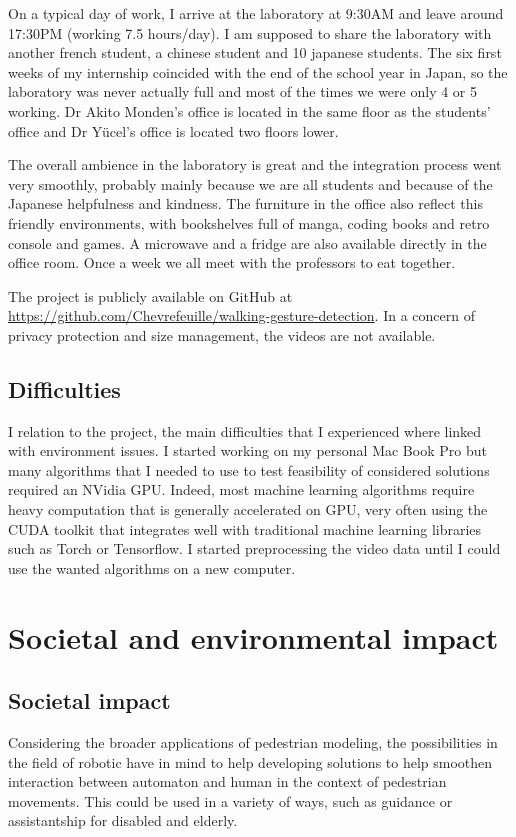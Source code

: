 \documentclass[12pt,a4paper,twoside]{article}
\begin{document}
On a typical day of work, I arrive at the laboratory at 9:30AM and leave around 17:30PM (working 7.5 hours/day). I am supposed to share the laboratory with another french student, a chinese student and 10 japanese students. The six first weeks of my internship coincided with the end of the school year in Japan, so the laboratory was never actually full and most of the times we were only 4 or 5 working. Dr Akito Monden's office is located in the same floor as the students' office and Dr Yücel's office is located two floors lower. 

The overall ambience in the laboratory is great and the integration process went very smoothly, probably mainly because we are all students and because of the Japanese helpfulness and kindness. The furniture in the office also reflect this friendly environments, with bookshelves full of manga, coding books and retro console and games. A microwave and a fridge are also available directly in the office room. Once a week we all meet with the professors to eat together.

The project is publicly available on GitHub at \url{https://github.com/Chevrefeuille/walking-gesture-detection}. In a concern of privacy protection and size management, the videos are not available.

\subsection{Difficulties}
I relation to the project, the main difficulties that I experienced where linked with environment issues. I started working on my personal Mac Book Pro but many algorithms that I needed to use to test feasibility of considered solutions required an NVidia GPU. Indeed, most machine learning algorithms require heavy computation that is generally accelerated on GPU, very often using the CUDA toolkit that integrates well with traditional machine learning libraries such as Torch or Tensorflow. I started preprocessing the video data until I could use the wanted algorithms on a new computer.

\newpage

\section{Societal and environmental impact}

\subsection{Societal impact}
Considering the broader applications of pedestrian modeling, the possibilities in the field of robotic have in mind to help developing solutions to help smoothen interaction between automaton and human in the context of pedestrian movements. This could be used in a variety of ways, such as guidance or assistantship for disabled and elderly. 
\end{document}

